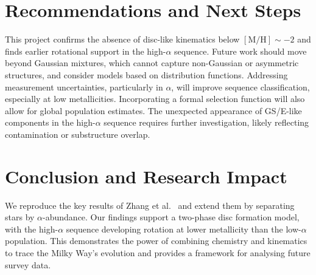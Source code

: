 \documentclass[a4paper,10pt]{article}
\begin{document}
\begin{multicols}{2}
\section*{Recommendations and Next Steps}

This project confirms the absence of disc-like kinematics below $\mathrm{[M/H]} \sim -2$ 
and finds earlier rotational support in the high-$\alpha$ sequence. Future work should move 
beyond Gaussian mixtures, which cannot capture non-Gaussian or asymmetric structures, and 
consider models based on distribution functions. Addressing measurement uncertainties, 
particularly in $\alpha$, will improve sequence classification, especially 
at low metallicities. Incorporating a formal selection function will also allow for global 
population estimates. The unexpected appearance of GS/E-like components in the high-$\alpha$ 
sequence requires further investigation, likely reflecting contamination or substructure overlap.

\section*{Conclusion and Research Impact}

We reproduce the key results of Zhang et al.~ \cite{zhang2024existencemetalpoordiscmilky} and 
extend them by separating stars by $\alpha$-abundance. Our findings support a two-phase disc 
formation model, with the high-$\alpha$ sequence developing rotation at lower metallicity than 
the low-$\alpha$ population. This demonstrates the power of combining chemistry and kinematics to 
trace the Milky Way’s evolution and provides a framework for analysing future survey data.













\end{multicols}
\end{document}
